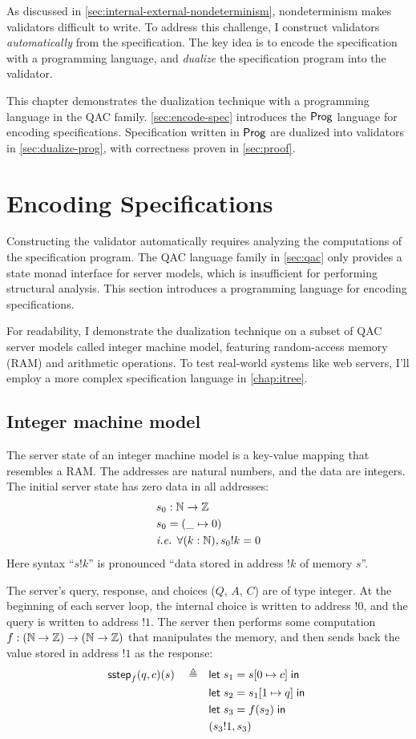 As discussed in \autoref{sec:internal-external-nondeterminism}, nondeterminism
makes validators difficult to write.  To address this challenge, I construct
validators {\em automatically} from the specification.  The key idea is to
encode the specification with a programming language, and {\em dualize} the
specification program into the validator.

This chapter demonstrates the dualization technique with a programming language
in the QAC family.  \autoref{sec:encode-spec} introduces the $\mathsf{Prog}$ language
for encoding specifications.  Specification written in $\mathsf{Prog}$ are dualized into
validators in \autoref{sec:dualize-prog}, with correctness proven in
\autoref{sec:proof}.

\section{Encoding Specifications}
\label{sec:encode-spec}
Constructing the validator automatically requires analyzing the computations of
the specification program.  The QAC language family in \autoref{sec:qac} only
provides a state monad interface for server models, which is insufficient for
performing structural analysis.  This section introduces a programming language
for encoding specifications.

For readability, I demonstrate the dualization technique on a subset of QAC
server models called integer machine model, featuring random-access memory (RAM)
and arithmetic operations.  To test real-world systems like web servers, I'll
employ a more complex specification language in \autoref{chap:itree}.

\subsection{Integer machine model}
The server state of an integer machine model is a key-value mapping that
resembles a RAM.  The addresses are natural numbers, and the data are integers.
The initial server state has zero data in all addresses:
\begin{align*}
  &s_0:\mathbb N\to\mathbb Z\\
  &s_0=(\_\mapsto0)\\
  &\textit{i.e. }\forall (k:\mathbb N), s_0!k=0
\end{align*}
Here syntax ``$s!k$'' is pronounced ``data stored in address $!k$ of memory
$s$''.

The server's query, response, and choices ($Q$, $A$, $C$) are of type integer.
At the beginning of each server loop, the internal choice is written to address
$!0$, and the query is written to address $!1$.  The server then performs some
computation $f:(\mathbb N\to\mathbb Z)\to(\mathbb N\to\mathbb Z)$ that manipulates the memory, and
then sends back the value stored in address $!1$ as the response:
\begin{align*}
  \mathsf{sstep}_f(q,c)(s)\quad\triangleq\quad&\mathsf{let}\; s_1=s[0\mapsto c]\;\mathsf{in}\;\\
  &\mathsf{let}\; s_2=s_1[1\mapsto q]\;\mathsf{in}\;\\
  &\mathsf{let}\; s_3=f(s_2)\;\mathsf{in}\;\\
  &(s_3!1,s_3)
\end{align*}

